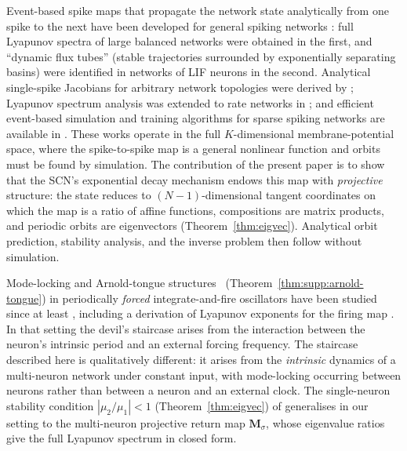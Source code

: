 \documentclass[12pt]{article}
\newcommand{\vv}[1]{\mathbf{#1}}
\begin{document}
Event-based spike maps that propagate the network state analytically from one spike to the next have been developed for general spiking networks \citep{monteforte2010dynamical,monteforte2012dynamic}: full Lyapunov spectra of large balanced networks were obtained in the first, and ``dynamic flux tubes'' (stable trajectories surrounded by exponentially separating basins) were identified in networks of LIF neurons in the second. Analytical single-spike Jacobians for arbitrary network topologies were derived by \citet{engelken2013dynamical}; Lyapunov spectrum analysis was extended to rate networks in \citep{engelken2023lyapunov}; and efficient event-based simulation and training algorithms for sparse spiking networks are available in \citep{engelken2023sparseprop}. These works operate in the full $K$-dimensional membrane-potential space, where the spike-to-spike map is a general nonlinear function and orbits must be found by simulation. The contribution of the present paper is to show that the SCN's exponential decay mechanism endows this map with \emph{projective} structure: the state reduces to $(N{-}1)$-dimensional tangent coordinates on which the map is a ratio of affine functions, compositions are matrix products, and periodic orbits are eigenvectors (Theorem~\ref{thm:eigvec}). Analytical orbit prediction, stability analysis, and the inverse problem then follow without simulation.

Mode-locking and Arnold-tongue structures~\citep{arnold1961small} (Theorem~\ref{thm:supp:arnold-tongue}) in periodically \emph{forced} integrate-and-fire oscillators have been studied since at least \citep{coombes1999mode}, including a derivation of Lyapunov exponents for the firing map \citep{coombes1999liapunov}. In that setting the devil's staircase arises from the interaction between the neuron's intrinsic period and an external forcing frequency. The staircase described here is qualitatively different: it arises from the \emph{intrinsic} dynamics of a multi-neuron network under constant input, with mode-locking occurring between neurons rather than between a neuron and an external clock. The single-neuron stability condition $|\mu_2/\mu_1|<1$ (Theorem~\ref{thm:eigvec}) of \citep{coombes1999liapunov} generalises in our setting to the multi-neuron projective return map $\vv{M}_\sigma$, whose eigenvalue ratios give the full Lyapunov spectrum in closed form.
\end{document}
